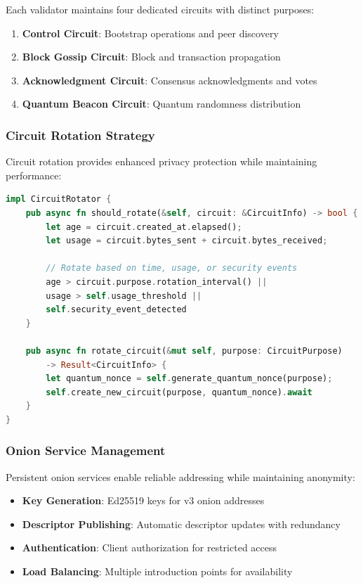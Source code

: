 \documentclass[11pt,a4paper]{article}
\theoremstyle{definition}
\theoremstyle{remark}
\begin{document}
Each validator maintains four dedicated circuits with distinct purposes:

\begin{enumerate}
    \item \textbf{Control Circuit}: Bootstrap operations and peer discovery
    \item \textbf{Block Gossip Circuit}: Block and transaction propagation
    \item \textbf{Acknowledgment Circuit}: Consensus acknowledgments and votes
    \item \textbf{Quantum Beacon Circuit}: Quantum randomness distribution
\end{enumerate}

\subsubsection{Circuit Rotation Strategy}

Circuit rotation provides enhanced privacy protection while maintaining performance:

\begin{lstlisting}[language=Rust, caption=Circuit Rotation Implementation]
impl CircuitRotator {
    pub async fn should_rotate(&self, circuit: &CircuitInfo) -> bool {
        let age = circuit.created_at.elapsed();
        let usage = circuit.bytes_sent + circuit.bytes_received;
        
        // Rotate based on time, usage, or security events
        age > circuit.purpose.rotation_interval() ||
        usage > self.usage_threshold ||
        self.security_event_detected
    }
    
    pub async fn rotate_circuit(&mut self, purpose: CircuitPurpose) 
        -> Result<CircuitInfo> {
        let quantum_nonce = self.generate_quantum_nonce(purpose);
        self.create_new_circuit(purpose, quantum_nonce).await
    }
}
\end{lstlisting}

\subsubsection{Onion Service Management}

Persistent onion services enable reliable addressing while maintaining anonymity:

\begin{itemize}
    \item \textbf{Key Generation}: Ed25519 keys for v3 onion addresses
    \item \textbf{Descriptor Publishing}: Automatic descriptor updates with redundancy
    \item \textbf{Authentication}: Client authorization for restricted access
    \item \textbf{Load Balancing}: Multiple introduction points for availability
\end{itemize}
\end{document}

